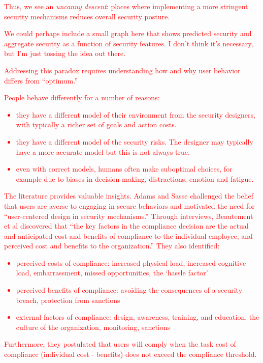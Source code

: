 \documentclass{acm_proc_article-sp}
\newcommand{\ignore}[1] {}
\begin{document}
\textcolor{red}{Thus, we see an \textit{uncanny descent}: places where implementing a more 
stringent security mechanisms reduces overall security posture.}

\ignore{Thus, what seems to be a simple monotonic relationship may in fact harbor
what graphics specialists call {\em uncanny valleys}: places where
dialing up the controls actually decreases overall security posture.}

\textcolor{red}{We could perhaps include a small graph here that shows 
predicted security and aggregate security as a function of security features. 
I don't think it's necessary, but I'm just tossing the idea out there.}

\textcolor{red}{Addressing this paradox requires understanding how and why user behavior
differs from ``optimum.''}

\textcolor{red}{
People behave differently for a number of reasons: 
\begin{itemize}
\item they have a
different model of their environment from the security designers, with
typically a richer set of goals and action costs.
\item they have a
different model of the security risks. The designer may typically have
a more accurate model but this is not always true.
\item even with
correct models, humans often make suboptimal choices, for example due
to biases in decision making, distractions, emotion and fatigue.
\end{itemize}
}

\textcolor{red}{The literature provides valuable insights. Adams and Sasse 
\cite{adams1999users} challenged the belief that users 
are averse to engaging in secure behaviors and motivated the need for 
``user-centered design in security mechanisms.'' 
Through interviews, Beautement et al  \cite{beautement2009compliance} discovered that ``the key factors in 
the compliance decision are the actual and anticipated cost and benefits of 
compliance to the individual employee, and perceived cost and benefits to 
the organization.'' They also identified:
\begin{itemize}
\item perceived costs of compliance: increased physical load, increased cognitive load, embarrassment, missed opportunities, the `hassle factor'
\item perceived benefits of compliance: avoiding the consequences of a security breach, protection from sanctions
\item external factors of compliance: design, awareness, training, and education, the culture of the organization, monitoring, sanctions
\end{itemize}
Furthermore, they postulated that users will comply when the task cost of 
compliance (individual cost - benefits) does not exceed the compliance threshold.
}
\end{document}
